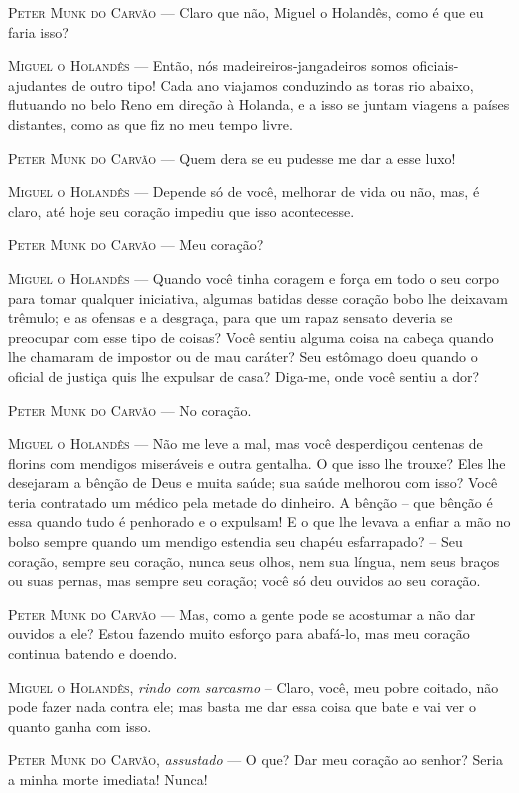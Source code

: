 \begin{myparindent}{0pt}
\begin{Parskip}
\textsc{Peter Munk do Carvão} --- Claro que não, Miguel o Holandês, como é que eu
faria isso?

\textsc{Miguel o Holandês} --- Então, nós madeireiros-jangadeiros somos
oficiais-ajudantes de outro tipo! Cada ano viajamos conduzindo as toras
rio abaixo, flutuando no belo Reno em direção à Holanda, e a isso se
juntam viagens a países distantes, como as que fiz no meu tempo livre.

\textsc{Peter Munk do Carvão} --- Quem dera se eu pudesse me dar a esse luxo!

\textsc{Miguel o Holandês} --- Depende só de você, melhorar de vida ou não, mas, é
claro, até hoje seu coração impediu que isso acontecesse.

\textsc{Peter Munk do Carvão} --- Meu coração?

\textsc{Miguel o Holandês} --- Quando você tinha coragem e força em todo o seu
corpo para tomar qualquer iniciativa, algumas batidas desse coração bobo
lhe deixavam trêmulo; e as ofensas e a desgraça, para que um rapaz
sensato deveria se preocupar com esse tipo de coisas? Você sentiu alguma
coisa na cabeça quando lhe chamaram de impostor ou de mau caráter? Seu
estômago doeu quando o oficial de justiça quis lhe expulsar de casa?
Diga-me, onde você sentiu a dor?

\textsc{Peter Munk do Carvão} --- No coração.

\textsc{Miguel o Holandês} --- Não me leve a mal, mas você desperdiçou centenas de
florins com mendigos miseráveis e outra gentalha. O que isso lhe trouxe?
Eles lhe desejaram a bênção de Deus e muita saúde; sua saúde melhorou
com isso? Você teria contratado um médico pela metade do dinheiro. A
bênção -- que bênção é essa quando tudo é penhorado e o expulsam! E o
que lhe levava a enfiar a mão no bolso sempre quando um mendigo estendia
seu chapéu esfarrapado? -- Seu coração, sempre seu coração, nunca seus
olhos, nem sua língua, nem seus braços ou suas pernas, mas sempre seu
coração; você só deu ouvidos ao seu coração.

\textsc{Peter Munk do Carvão} --- Mas, como a gente pode se acostumar a não dar
ouvidos a ele? Estou fazendo muito esforço para abafá-lo, mas meu
coração continua batendo e doendo.

\textsc{Miguel o Holandês}, \emph{rindo com sarcasmo} -- Claro, você, meu pobre
coitado, não pode fazer nada contra ele; mas basta me dar essa coisa que
bate e vai ver o quanto ganha com isso.

\textsc{Peter Munk do Carvão}, \emph{assustado} --- O que? Dar meu coração ao
senhor? Seria a minha morte imediata! Nunca!


\end{Parskip}
\end{myparindent}
